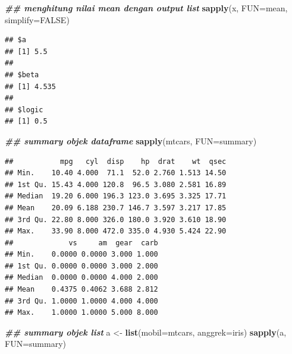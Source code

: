 \documentclass[
]{book}
\newenvironment{Shaded}{\begin{snugshade}}{\end{snugshade}}
\newcommand{\AttributeTok}[1]{\textcolor[rgb]{0.13,0.29,0.53}{#1}}
\newcommand{\ConstantTok}[1]{\textcolor[rgb]{0.56,0.35,0.01}{#1}}
\newcommand{\DocumentationTok}[1]{\textcolor[rgb]{0.56,0.35,0.01}{\textbf{\textit{#1}}}}
\newcommand{\FunctionTok}[1]{\textcolor[rgb]{0.13,0.29,0.53}{\textbf{#1}}}
\newcommand{\NormalTok}[1]{#1}
\newcommand{\OtherTok}[1]{\textcolor[rgb]{0.56,0.35,0.01}{#1}}
\theoremstyle{definition}
\theoremstyle{definition}
\theoremstyle{definition}
\theoremstyle{definition}
\theoremstyle{remark}
\begin{document}
\begin{Shaded}
\begin{Highlighting}[]
\DocumentationTok{\#\# menghitung nilai mean dengan output list}
\FunctionTok{sapply}\NormalTok{(x, }\AttributeTok{FUN=}\NormalTok{mean, }\AttributeTok{simplify=}\ConstantTok{FALSE}\NormalTok{)}
\end{Highlighting}
\end{Shaded}

\begin{verbatim}
## $a
## [1] 5.5
## 
## $beta
## [1] 4.535
## 
## $logic
## [1] 0.5
\end{verbatim}

\begin{Shaded}
\begin{Highlighting}[]
\DocumentationTok{\#\# summary objek dataframe}
\FunctionTok{sapply}\NormalTok{(mtcars, }\AttributeTok{FUN=}\NormalTok{summary)}
\end{Highlighting}
\end{Shaded}

\begin{verbatim}
##           mpg   cyl  disp    hp  drat    wt  qsec
## Min.    10.40 4.000  71.1  52.0 2.760 1.513 14.50
## 1st Qu. 15.43 4.000 120.8  96.5 3.080 2.581 16.89
## Median  19.20 6.000 196.3 123.0 3.695 3.325 17.71
## Mean    20.09 6.188 230.7 146.7 3.597 3.217 17.85
## 3rd Qu. 22.80 8.000 326.0 180.0 3.920 3.610 18.90
## Max.    33.90 8.000 472.0 335.0 4.930 5.424 22.90
##             vs     am  gear  carb
## Min.    0.0000 0.0000 3.000 1.000
## 1st Qu. 0.0000 0.0000 3.000 2.000
## Median  0.0000 0.0000 4.000 2.000
## Mean    0.4375 0.4062 3.688 2.812
## 3rd Qu. 1.0000 1.0000 4.000 4.000
## Max.    1.0000 1.0000 5.000 8.000
\end{verbatim}

\begin{Shaded}
\begin{Highlighting}[]
\DocumentationTok{\#\# summary objek list}
\NormalTok{a }\OtherTok{\textless{}{-}} \FunctionTok{list}\NormalTok{(}\AttributeTok{mobil=}\NormalTok{mtcars, }\AttributeTok{anggrek=}\NormalTok{iris)}
\FunctionTok{sapply}\NormalTok{(a, }\AttributeTok{FUN=}\NormalTok{summary)}
\end{Highlighting}
\end{Shaded}
\end{document}
